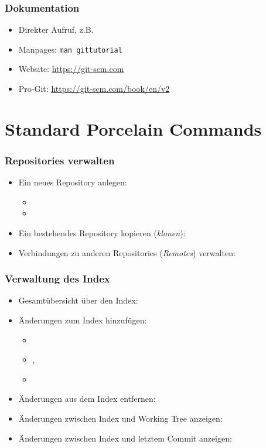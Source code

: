 \documentclass{cms-kurs}
\begin{document}
\begin{frame}
  \frametitle{Dokumentation}

  \onslide<+->

  \begin{itemize}
  \item Direkter Aufruf, z.B.{} 
  \item Manpages: \lstinline{man gittutorial}
  \item Website: \url{https://git-scm.com}
  \item Pro-Git: \url{https://git-scm.com/book/en/v2}
  \end{itemize}

\end{frame}

\section{Standard Porcelain Commands}

\begin{frame}
  \frametitle{Repositories verwalten}

  \onslide<+->

  \begin{itemize}
  \item Ein neues Repository anlegen:
    \begin{itemize}
    \item {}
    \item {}
    \end{itemize}
  \item Ein bestehendes Repository kopieren (\emph{klonen}): 
  \item Verbindungen zu anderen Repositories (\emph{Remotes}) verwalten:
  \end{itemize}

\end{frame}

\begin{frame}
  \frametitle{Verwaltung des Index}

  \onslide<+->

  \begin{itemize}
  \item Gesamtübersicht über den Index: 
  \item Änderungen zum Index hinzufügen:
    \begin{itemize}
    \item {}
    \item {}, 
    \item {}
    \end{itemize}
  \item Änderungen aus dem Index entfernen: 
  \item Änderungen zwischen Index und Working Tree anzeigen: 
  \item Änderungen zwischen Index und letztem Commit anzeigen: 
  \end{itemize}

\end{frame}
\end{document}
